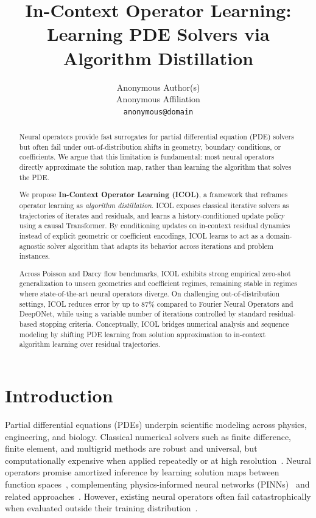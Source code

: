 \documentclass{article}
\title{
In-Context Operator Learning:\\
Learning PDE Solvers via Algorithm Distillation
}
\author{
Anonymous Author(s)\\
Anonymous Affiliation\\
\texttt{anonymous@domain}
}
\date{}
\begin{document}
\maketitle

\begin{abstract}
Neural operators provide fast surrogates for partial differential equation (PDE) solvers but often fail under out-of-distribution shifts in geometry, boundary conditions, or coefficients. We argue that this limitation is fundamental: most neural operators directly approximate the solution map, rather than learning the algorithm that solves the PDE.

We propose \textbf{In-Context Operator Learning (ICOL)}, a framework that reframes operator learning as \emph{algorithm distillation}. ICOL exposes classical iterative solvers as trajectories of iterates and residuals, and learns a history-conditioned update policy using a causal Transformer. By conditioning updates on in-context residual dynamics instead of explicit geometric or coefficient encodings, ICOL learns to act as a domain-agnostic solver algorithm that adapts its behavior across iterations and problem instances.

Across Poisson and Darcy flow benchmarks, ICOL exhibits strong empirical zero-shot generalization to unseen geometries and coefficient regimes, remaining stable in regimes where state-of-the-art neural operators diverge. On challenging out-of-distribution settings, ICOL reduces error by up to 87\% compared to Fourier Neural Operators and DeepONet, while using a variable number of iterations controlled by standard residual-based stopping criteria. Conceptually, ICOL bridges numerical analysis and sequence modeling by shifting PDE learning from solution approximation to in-context algorithm learning over residual trajectories.
\end{abstract}

\section{Introduction}

Partial differential equations (PDEs) underpin scientific modeling across physics, engineering, and biology. Classical numerical solvers such as finite difference, finite element, and multigrid methods are robust and universal, but computationally expensive when applied repeatedly or at high resolution~\cite{leveque2007finite,briggs2000multigrid,elman2014finite}. Neural operators promise amortized inference by learning solution maps between function spaces~\cite{li2020fourier,lu2021deeponet,kovachki2021neuraloperators,dong2023operatorreview}, complementing physics-informed neural networks (PINNs)~\cite{raissi2019pinn,karniadakis2021physics} and related approaches~\cite{rackauckas2020universal,li2021physicsinformed}. However, existing neural operators often fail catastrophically when evaluated outside their training distribution~\cite{lu2022comprehensive,li2022neuraloperatorreview}.
\end{document}
